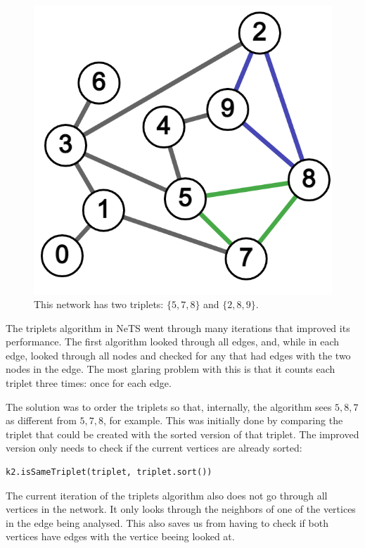 \begin{figure}[H]
  \centering
  \includegraphics[scale=.25]{img/triplets.png}
  \caption{This network has two triplets: $\{5,7,8\}$ and $\{2,8,9\}$.}
  \label{fig:core_ex}
\end{figure}
The triplets algorithm in NeTS went through many iterations that improved its performance.
The first algorithm looked through all edges, and, while in each edge,
looked through all nodes and checked for any that had edges with the two nodes in the edge.
The most glaring problem with this is that it counts each triplet three times:
once for each edge.

The solution was to order the triplets so that, internally, the algorithm
sees $5,8,7$ as different from $5,7,8$, for example.
This was initially done by comparing the triplet that could be created
with the sorted version of that triplet.
The improved version only needs to check if the current vertices are already sorted:
\begin{verbatim}
k2.isSameTriplet(triplet, triplet.sort())
\end{verbatim}

The current iteration of the triplets algorithm also does not go through all vertices in the network.
It only looks through the neighbors of one of the vertices in the edge being analysed.
This also saves us from having to check if both vertices have edges with the vertice beeing looked at.

